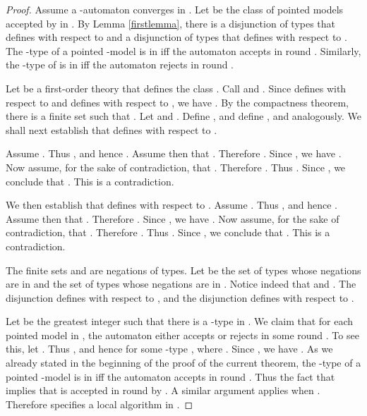 \documentclass[copyright,creativecommons]{eptcs}
\begin{document}
\begin{proof}
Assume a -automaton  converges in .
Let  be the class of pointed models accepted by  in .
By Lemma \ref{firstlemma}\hspace{0.4mm}, there is a
disjunction   of types that defines  with respect to 
and a disjunction  of types that defines  with respect to .
The -type of a pointed -model  is in  iff
the automaton  accepts  in round . Similarly, the -type of 
is in  iff the automaton  rejects  in round .




Let   be a first-order theory that defines the class .
Call  and
. 
Since  defines  with
respect to  and  defines
 with
respect to , we have .
By the compactness theorem, there is a finite set 
such that .
Let  and .
Define , 
and define ,  and  analogously.
We shall next establish that  defines  with respect to .




Assume .
Thus ,
and hence .
Assume then that .
Therefore .
Since , we have .
Now assume, for the sake of contradiction, that .
Therefore . 
Thus .
Since , we conclude that .
This is a contradiction.




We then establish that 
defines 
with respect to .
Assume .
Thus ,
and hence .
Assume then that .
Therefore .
Since , we have .
Now assume, for the sake of contradiction, that .
Therefore . 
Thus .
Since , we conclude that .
This is a contradiction.




The finite sets  and  are negations of types. Let  be the set of types whose negations are in 
and  the set of types whose negations are in .
Notice indeed that  and .
The disjunction 
defines 
with respect to , and the disjunction  defines 
with respect to .




Let  be the greatest integer  such that there is a -type in .
We claim that for each pointed model  in , the automaton  either accepts or rejects 
in some round . To see this, let . Thus ,
and hence  for some -type , where . 
Since , we have .
As we already stated in the beginning of the proof of the current theorem,
the -type of a pointed -model  is in  iff
the automaton  accepts  in round .
Thus the fact that  implies that  is
accepted in round  by . A similar argument applies when .
Therefore  specifies a local algorithm in .
\end{proof}
\end{document}
